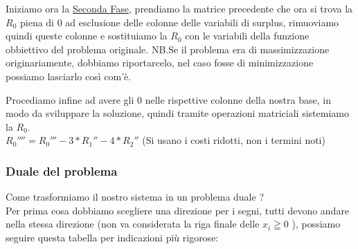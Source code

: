 \documentclass{article}
\begin{document}
Iniziamo ora la \underline{Seconda Fase}, prendiamo la matrice precedente che ora si trova la $R_0$ piena di 0 ad esclusione delle colonne delle variabili di surplus, rimuoviamo quindi queste colonne e sostituiamo la $R_0$ con le variabili della funzione obbiettivo del problema originale.
NB.Se il problema era di massimizzazione originariamente, dobbiamo riportarcelo, nel caso fosse di minimizzazione possiamo lasciarlo così com'è.\\
\begin{center}
\end{center}

Procediamo infine ad avere gli 0 nelle rispettive colonne della nostra base, in modo da sviluppare la soluzione, quindi tramite operazioni matriciali sistemiamo la $R_0$.\\
$R_0'''' = R_0''' - 3 * R_1'' - 4 * R_2''$     (Si usano i costi ridotti, non i termini noti)\\
\begin{center}
\end{center}

\subsubsection{Duale del problema}
Come trasformiamo il nostro sistema in un problema duale ?\\
Per prima cosa dobbiamo scegliere una direzione per i segni, tutti devono andare nella stessa direzione (non va considerata la riga finale delle $x_i \geqq 0$ ), possiamo seguire questa tabella per indicazioni più rigorose:\\
\end{document}
